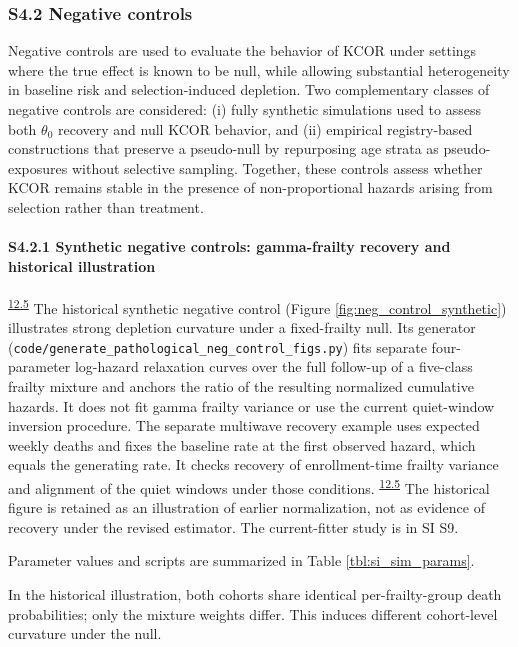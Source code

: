 \documentclass[
]{article}
\begin{document}
\subsubsection{S4.2 Negative controls}\label{s4.2-negative-controls}

Negative controls are used to evaluate the behavior of KCOR under settings where the true effect is known to be null, while allowing substantial heterogeneity in baseline risk and selection-induced depletion. Two complementary classes of negative controls are considered: (i) fully synthetic simulations used to assess both \(\theta_0\) recovery and null KCOR behavior, and (ii) empirical registry-based constructions that preserve a pseudo-null by repurposing age strata as pseudo-exposures without selective sampling. Together, these controls assess whether KCOR remains stable in the presence of non-proportional hazards arising from selection rather than treatment.

\paragraph{S4.2.1 Synthetic negative controls: gamma-frailty recovery and historical illustration}\label{s4.2.1-synthetic-negative-control-gamma-frailty-null}

\textsuperscript{\hyperlink{issue-12.5}{12.5}} {\color{red} The historical synthetic negative control (Figure \ref{fig:neg_control_synthetic}) illustrates strong depletion curvature under a fixed-frailty null. Its generator (\texttt{code/generate\_pathological\_neg\_control\_figs.py}) fits separate four-parameter log-hazard relaxation curves over the full follow-up of a five-class frailty mixture and anchors the ratio of the resulting normalized cumulative hazards. It does not fit gamma frailty variance or use the current quiet-window inversion procedure.} The separate multiwave recovery example uses expected weekly deaths and fixes the baseline rate at the first observed hazard, which equals the generating rate. It checks recovery of enrollment-time frailty variance and alignment of the quiet windows under those conditions. \textsuperscript{\hyperlink{issue-12.5}{12.5}} {\color{red} The historical figure is retained as an illustration of earlier normalization, not as evidence of recovery under the revised estimator. The current-fitter study is in SI S9.}

Parameter values and scripts are summarized in Table \ref{tbl:si_sim_params}.

In the historical illustration, both cohorts share identical per-frailty-group death probabilities; only the mixture weights differ. This induces different cohort-level curvature under the null.
\end{document}
